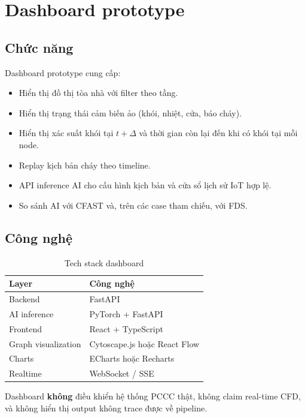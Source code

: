\section{Dashboard prototype}
\label{sec:dashboard}

\subsection{Chức năng}

Dashboard prototype cung cấp:
\begin{itemize}
  \item Hiển thị đồ thị tòa nhà với filter theo tầng.
  \item Hiển thị trạng thái cảm biến ảo (khói, nhiệt, cửa, báo cháy).
  \item Hiển thị xác suất khói tại $t+\Delta$ và thời gian còn lại đến khi có khói tại mỗi node.
  \item Replay kịch bản cháy theo timeline.
  \item API inference AI cho cấu hình kịch bản và cửa sổ lịch sử IoT hợp lệ.
  \item So sánh AI với CFAST và, trên các case tham chiếu, với FDS.
\end{itemize}

\subsection{Công nghệ}

\begin{table}[H]
\centering
\caption{Tech stack dashboard}
\label{tab:techstack}
\begin{tabular}{l l}
\toprule
\textbf{Layer} & \textbf{Công nghệ} \\
\midrule
Backend          & FastAPI \\
AI inference     & PyTorch + FastAPI \\
Frontend         & React + TypeScript \\
Graph visualization & Cytoscape.js hoặc React Flow \\
Charts           & ECharts hoặc Recharts \\
Realtime         & WebSocket / SSE \\
\bottomrule
\end{tabular}
\end{table}

Dashboard \textbf{không} điều khiển hệ thống PCCC thật, không claim real-time CFD, và không hiển thị output không trace được về pipeline.
